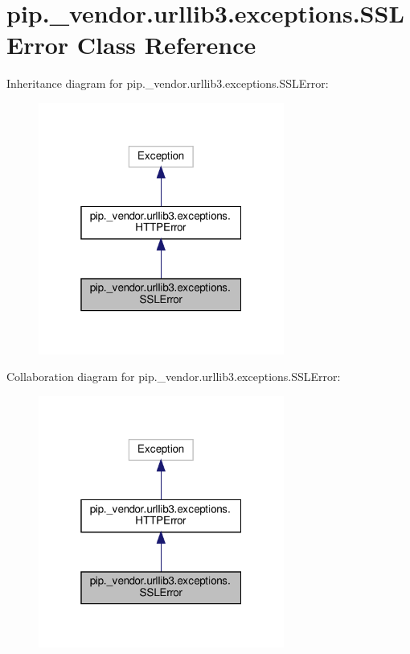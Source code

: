 \hypertarget{classpip_1_1__vendor_1_1urllib3_1_1exceptions_1_1SSLError}{}\section{pip.\+\_\+vendor.\+urllib3.\+exceptions.\+S\+S\+L\+Error Class Reference}
\label{classpip_1_1__vendor_1_1urllib3_1_1exceptions_1_1SSLError}


Inheritance diagram for pip.\+\_\+vendor.\+urllib3.\+exceptions.\+S\+S\+L\+Error\+:
\nopagebreak
\begin{figure}[H]
\begin{center}
\leavevmode
\includegraphics[width=229pt]{classpip_1_1__vendor_1_1urllib3_1_1exceptions_1_1SSLError__inherit__graph}
\end{center}
\end{figure}


Collaboration diagram for pip.\+\_\+vendor.\+urllib3.\+exceptions.\+S\+S\+L\+Error\+:
\nopagebreak
\begin{figure}[H]
\begin{center}
\leavevmode
\includegraphics[width=229pt]{classpip_1_1__vendor_1_1urllib3_1_1exceptions_1_1SSLError__coll__graph}
\end{center}
\end{figure}


